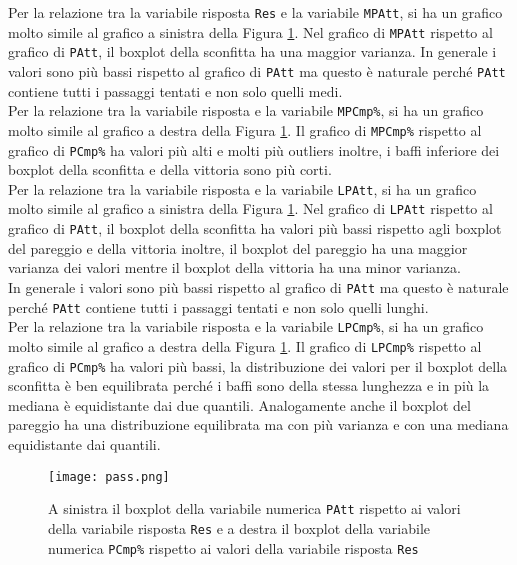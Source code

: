 Per la relazione tra la variabile risposta \texttt{Res} e la variabile \texttt{MPAtt}, si ha un grafico molto simile al grafico a sinistra della Figura \ref{fig:pass}. Nel grafico di \texttt{MPAtt} rispetto al grafico di \texttt{PAtt}, il boxplot della sconfitta ha una maggior varianza. In generale i valori sono più bassi rispetto al grafico di \texttt{PAtt} ma questo è naturale perché \texttt{PAtt} contiene tutti i passaggi tentati e non solo quelli medi.\\
Per la relazione tra la variabile risposta e la variabile \texttt{MPCmp\%}, si ha un grafico molto simile al grafico a destra della Figura \ref{fig:pass}. Il grafico di \texttt{MPCmp\%} rispetto al grafico di \texttt{PCmp\%} ha valori più alti e molti più outliers inoltre, i baffi inferiore dei boxplot della sconfitta e della vittoria sono più corti.\\
Per la relazione tra la variabile risposta e la variabile \texttt{LPAtt}, si ha un grafico molto simile al grafico a sinistra della Figura \ref{fig:pass}. Nel grafico di \texttt{LPAtt} rispetto al grafico di \texttt{PAtt}, il boxplot della sconfitta ha valori più bassi rispetto agli boxplot del pareggio e della vittoria inoltre, il boxplot del pareggio ha una maggior varianza dei valori mentre il boxplot della vittoria ha una minor varianza.\\
In generale i valori sono più bassi rispetto al grafico di \texttt{PAtt} ma questo è naturale perché \texttt{PAtt} contiene tutti i passaggi tentati e non solo quelli lunghi.\\
Per la relazione tra la variabile risposta e la variabile \texttt{LPCmp\%}, si ha un grafico molto simile al grafico a destra della Figura \ref{fig:pass}. Il grafico di \texttt{LPCmp\%} rispetto al grafico di \texttt{PCmp\%} ha valori più bassi, la distribuzione dei valori per il boxplot della sconfitta è ben equilibrata perché i baffi sono della stessa lunghezza e in più la mediana è equidistante dai due quantili. Analogamente anche il boxplot del pareggio ha una distribuzione equilibrata ma con più varianza e con una mediana equidistante dai quantili.\\
\begin{figure}[htbp]
	\begin{center}
		\texttt{[image: pass.png]}
		\caption{A sinistra il boxplot della variabile numerica \texttt{PAtt} rispetto ai valori della variabile risposta \texttt{Res} e a destra il boxplot della variabile numerica \texttt{PCmp\%} rispetto ai valori della variabile risposta \texttt{Res}} \label{fig:pass}
	\end{center}
\end{figure}
